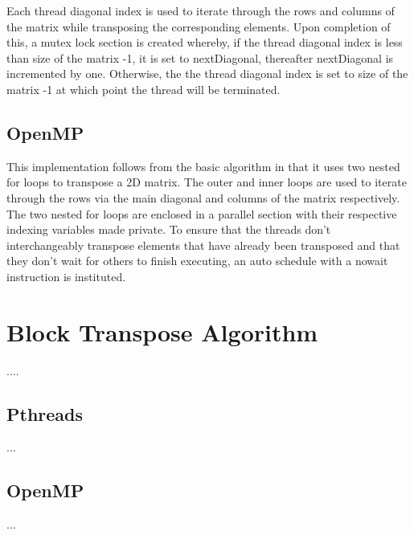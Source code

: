 \documentclass[10pt,onecolumn]{article}
\begin{document}
Each thread diagonal index is used to iterate through the rows and columns of the matrix while transposing the corresponding elements. Upon completion of this, a mutex lock section is created whereby, if the thread diagonal index is less than size of the matrix -1, it is set to nextDiagonal, thereafter nextDiagonal is incremented by one. Otherwise, the the thread diagonal index is set to size of the matrix -1 at which point the thread will be terminated. 


%
\subsection{OpenMP}
%
This implementation follows from the basic algorithm in that it uses two nested for loops to transpose a 2D matrix. The outer and inner loops are used to iterate through the rows via the main diagonal and columns of the matrix respectively. The two nested for loops are enclosed in a parallel section with their respective indexing variables made private. To ensure that the threads don't interchangeably transpose elements that have already been transposed and that they don't wait for others to finish executing, an auto schedule with a nowait instruction is instituted.
%
\section{Block Transpose Algorithm}
%
....
%
\subsection{Pthreads}
%
...
%
\subsection{OpenMP}
%
...
%
%
\end{document}
